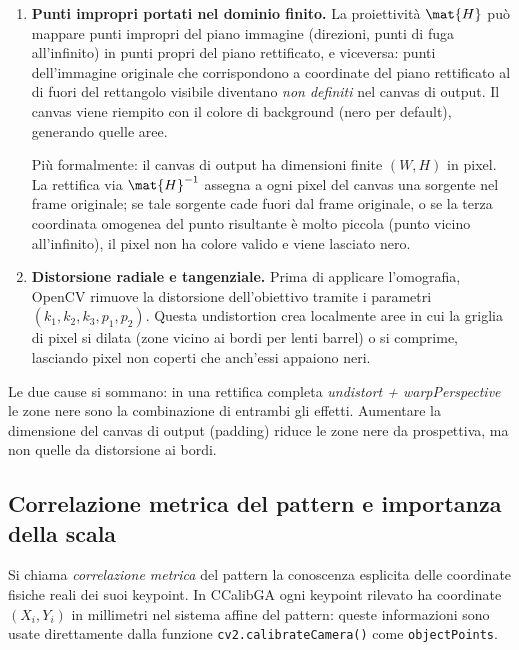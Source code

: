 \begin{enumerate}
  \item \textbf{Punti impropri portati nel dominio finito.}
  La proiettività \(\mat{H}\) può mappare punti impropri del piano
  immagine (direzioni, punti di fuga all'infinito) in punti propri del
  piano rettificato, e viceversa: punti dell'immagine originale che
  corrispondono a coordinate del piano rettificato al di fuori
  del rettangolo visibile diventano \emph{non definiti} nel canvas
  di output. Il canvas viene riempito con il colore di background
  (nero per default), generando quelle aree.

  Più formalmente: il canvas di output ha dimensioni finite
  \((W, H)\) in pixel. La rettifica via \(\mat{H}^{-1}\) assegna
  a ogni pixel del canvas una sorgente nel frame originale; se tale
  sorgente cade fuori dal frame originale, o se la terza coordinata
  omogenea del punto risultante è molto piccola (punto vicino
  all'infinito), il pixel non ha colore valido e viene lasciato nero.

  \item \textbf{Distorsione radiale e tangenziale.}
  Prima di applicare l'omografia, OpenCV rimuove la distorsione
  dell'obiettivo tramite i parametri \((k_1, k_2, k_3, p_1, p_2)\).
  Questa undistortion crea localmente aree in cui la griglia di pixel
  si dilata (zone vicino ai bordi per lenti barrel) o si comprime,
  lasciando pixel non coperti che anch'essi appaiono neri.
\end{enumerate}

Le due cause si sommano: in una rettifica completa \emph{undistort +
warpPerspective} le zone nere sono la combinazione di entrambi gli
effetti. Aumentare la dimensione del canvas di output (padding) riduce
le zone nere da prospettiva, ma non quelle da distorsione ai bordi.

\subsection{Correlazione metrica del pattern e importanza della scala}
\label{sub:scala_metrica}

Si chiama \emph{correlazione metrica} del pattern la conoscenza
esplicita delle coordinate fisiche reali dei suoi keypoint.
In CCalibGA ogni keypoint rilevato ha coordinate
\((X_i, Y_i)\) in millimetri nel sistema affine del pattern:
queste informazioni sono usate direttamente dalla funzione
\texttt{cv2.calibrateCamera()} come \texttt{objectPoints}.

